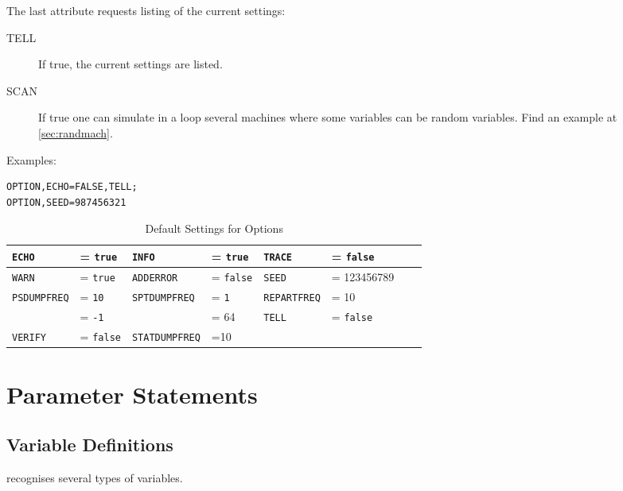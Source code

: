      
The last attribute requests listing of the current settings:
\begin{description}
\item[TELL]
  If true, the current settings are listed.
\item[SCAN]
 If true one can simulate in a loop several machines where some variables can be random variables. Find an
 example at \ref{sec:randmach}. 
\end{description}


\noindent Examples:
\begin{verbatim}
OPTION,ECHO=FALSE,TELL;
OPTION,SEED=987456321
\end{verbatim}

\begin{table}[ht] \footnotesize
  \caption{Default Settings for Options}
  \label{tab:option}
  \begin{center}
    \begin{tabular}{|ll|ll|ll|ll|}
      \hline
      \texttt{ECHO}     & = \texttt{true}  &
      \texttt{INFO}     & = \texttt{true}  &
      \texttt{TRACE}    & = \texttt{false} \\
      \hline
      \texttt{WARN}     & = \texttt{true } &
      \texttt{ADDERROR} & = \texttt{false} &
      \texttt{SEED}     & = 123456789      \\
      \hline
       \texttt{PSDUMPFREQ}     & = \texttt{10 } &
      \texttt{SPTDUMPFREQ} & = \texttt{1} &
      \texttt{REPARTFREQ}     & = 10  \\
      \hline
            \texttt{ }     & = \texttt{-1 } &
      \texttt{ }     &  = 64 &
        \texttt{TELL}     & = \texttt{false} \\
       \hline
         \texttt{VERIFY}   & = \texttt{false} &
         \texttt{STATDUMPFREQ}     & =10  &
           \texttt{}     & & \\
             \hline
    \end{tabular}
  \end{center}
\end{table}

\section{Parameter Statements}
\label{sec:parameter}

\subsection{Variable Definitions}
\label{sec:variable}
\opal recognises several types of variables.

